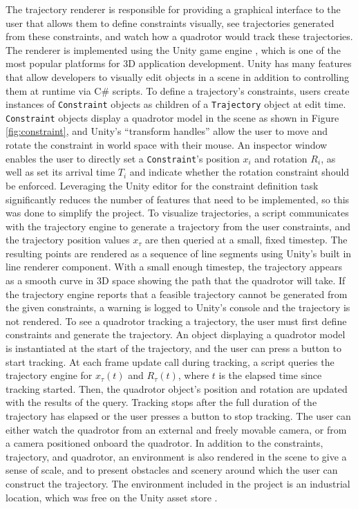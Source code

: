 \documentclass[pageno]{jpaper}
\newcommand{\quotes}[1]{``#1''}
\begin{document}
The trajectory renderer is responsible for providing a graphical interface to the user that allows them to define constraints visually, see trajectories generated from these constraints, and watch how a quadrotor would track these trajectories. The renderer is implemented using the Unity game engine \cite{unity}, which is one of the most popular platforms for 3D application development. Unity has many features that allow developers to visually edit objects in a scene in addition to controlling them at runtime via C\# scripts. To define a trajectory's constraints, users create instances of \texttt{Constraint} objects as children of a \texttt{Trajectory} object at edit time. \texttt{Constraint} objects display a quadrotor model in the scene \cite{model} as shown in Figure \ref{fig:constraint}, and Unity's \quotes{transform handles} allow the user to move and rotate the constraint in world space with their mouse. An inspector window enables the user to directly set a \texttt{Constraint}'s position $x_i$ and rotation $R_i$, as well as set its arrival time $T_i$ and indicate whether the rotation constraint should be enforced. Leveraging the Unity editor for the constraint definition task significantly reduces the number of features that need to be implemented, so this was done to simplify the project. To visualize trajectories, a script communicates with the trajectory engine to generate a trajectory from the user constraints, and the trajectory position values $x_\tau$ are then queried at a small, fixed timestep. The resulting points are rendered as a sequence of line segments using Unity's built in line renderer component. With a small enough timestep, the trajectory appears as a smooth curve in 3D space showing the path that the quadrotor will take. If the trajectory engine reports that a feasible trajectory cannot be generated from the given constraints, a warning is logged to Unity's console and the trajectory is not rendered. To see a quadrotor tracking a trajectory, the user must first define constraints and generate the trajectory. An object displaying a quadrotor model is instantiated at the start of the trajectory, and the user can press a button to start tracking. At each frame update call during tracking, a script queries the trajectory engine for $x_\tau(t)$ and $R_\tau(t)$, where $t$ is the elapsed time since tracking started. Then, the quadrotor object's position and rotation are updated with the results of the query. Tracking stops after the full duration of the trajectory has elapsed or the user presses a button to stop tracking. The user can either watch the quadrotor from an external and freely movable camera, or from a camera positioned onboard the quadrotor. In addition to the constraints, trajectory, and quadrotor, an environment is also rendered in the scene to give a sense of scale, and to present obstacles and scenery around which the user can construct the trajectory. The environment included in the project is an industrial location, which was free on the Unity asset store \cite{scene}.
\end{document}
